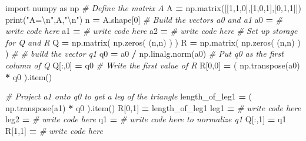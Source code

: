 \documentclass[
]{book}
\newenvironment{Shaded}{\begin{snugshade}}{\end{snugshade}}
\newcommand{\BuiltInTok}[1]{#1}
\newcommand{\CharTok}[1]{\textcolor[rgb]{0.31,0.60,0.02}{#1}}
\newcommand{\CommentTok}[1]{\textcolor[rgb]{0.56,0.35,0.01}{\textit{#1}}}
\newcommand{\DecValTok}[1]{\textcolor[rgb]{0.00,0.00,0.81}{#1}}
\newcommand{\ImportTok}[1]{#1}
\newcommand{\NormalTok}[1]{#1}
\newcommand{\OperatorTok}[1]{\textcolor[rgb]{0.81,0.36,0.00}{\textbf{#1}}}
\newcommand{\StringTok}[1]{\textcolor[rgb]{0.31,0.60,0.02}{#1}}
\theoremstyle{definition}
\theoremstyle{definition}
\theoremstyle{definition}
\theoremstyle{remark}
\begin{document}
\begin{Shaded}
\begin{Highlighting}[]
\ImportTok{import}\NormalTok{ numpy }\ImportTok{as}\NormalTok{ np}
\CommentTok{\# Define the matrix $A$}
\NormalTok{A }\OperatorTok{=}\NormalTok{ np.matrix([[}\DecValTok{1}\NormalTok{,}\DecValTok{1}\NormalTok{,}\DecValTok{0}\NormalTok{],[}\DecValTok{1}\NormalTok{,}\DecValTok{0}\NormalTok{,}\DecValTok{1}\NormalTok{],[}\DecValTok{0}\NormalTok{,}\DecValTok{1}\NormalTok{,}\DecValTok{1}\NormalTok{]])}
\BuiltInTok{print}\NormalTok{(}\StringTok{"A=}\CharTok{\textbackslash{}n}\StringTok{"}\NormalTok{,A,}\StringTok{"}\CharTok{\textbackslash{}n}\StringTok{"}\NormalTok{)}
\NormalTok{n }\OperatorTok{=}\NormalTok{ A.shape[}\DecValTok{0}\NormalTok{]}
\CommentTok{\# Build the vectors a0 and a1}
\NormalTok{a0 }\OperatorTok{=} \CommentTok{\# write code here}
\NormalTok{a1 }\OperatorTok{=} \CommentTok{\# write code here}
\NormalTok{a2 }\OperatorTok{=} \CommentTok{\# write code here}
\CommentTok{\# Set up storage for Q and R}
\NormalTok{Q }\OperatorTok{=}\NormalTok{ np.matrix( np.zeros( (n,n) ) )}
\NormalTok{R }\OperatorTok{=}\NormalTok{ np.matrix( np.zeros( (n,n) ) )}
\CommentTok{\# \# build the vector q1}
\NormalTok{q0 }\OperatorTok{=}\NormalTok{ a0 }\OperatorTok{/}\NormalTok{ np.linalg.norm(a0)}
\CommentTok{\# Put q0 as the first column of Q}
\NormalTok{Q[:,}\DecValTok{0}\NormalTok{] }\OperatorTok{=}\NormalTok{ q0}
\CommentTok{\# Write the first value of R}
\NormalTok{R[}\DecValTok{0}\NormalTok{,}\DecValTok{0}\NormalTok{] }\OperatorTok{=}\NormalTok{ ( np.transpose(a0) }\OperatorTok{*}\NormalTok{ q0 ).item()}

\CommentTok{\# Project a1 onto q0 to get a leg of the triangle}
\NormalTok{length\_of\_leg1 }\OperatorTok{=}\NormalTok{ ( np.transpose(a1) }\OperatorTok{*}\NormalTok{ q0 ).item() }
\NormalTok{R[}\DecValTok{0}\NormalTok{,}\DecValTok{1}\NormalTok{] }\OperatorTok{=}\NormalTok{ length\_of\_leg1}
\NormalTok{leg1 }\OperatorTok{=} \CommentTok{\# write code here}
\NormalTok{leg2 }\OperatorTok{=} \CommentTok{\# write code here}
\NormalTok{q1 }\OperatorTok{=} \CommentTok{\# write code here to normalize q1}
\NormalTok{Q[:,}\DecValTok{1}\NormalTok{] }\OperatorTok{=}\NormalTok{ q1}
\NormalTok{R[}\DecValTok{1}\NormalTok{,}\DecValTok{1}\NormalTok{] }\OperatorTok{=} \CommentTok{\# write code here}


\end{Highlighting}
\end{Shaded}
\end{document}
